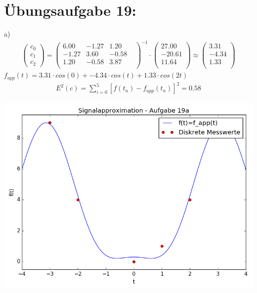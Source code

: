 

	\section*{Übungsaufgabe 19:}
	a) \newline
	\begin{align*}
	\left(\begin{matrix}c_0\\c_1\\c_2\end{matrix}\right) =
	\left(\begin{matrix}
			6.00 & -1.27 & 1.20 & \\
			-1.27 & 3.60 & -0.58 & \\
			1.20 & -0.58 & 3.87 & \\
	\end{matrix}\right)^{-1} \cdot
	\left(\begin{matrix}
			27.00\\
			-20.61\\
			11.64\\
	\end{matrix}\right) \approx
	\left(\begin{matrix}
			3.31\\
			-4.34\\
			1.33\\
	\end{matrix}\right)
	\end{align*}
	$f_{app}(t) = 3.31 \cdot cos(0) + -4.34 \cdot cos(t) + 1.33 \cdot cos(2t) $
	\begin{align*}
			E^2(c) = \sum_{i=0}^5 \left[ f(t_n) - f_{app}(t_n)\right]^2 = 0.58
	\end{align*}

	\includegraphics[scale=0.8]{A19a.png}

